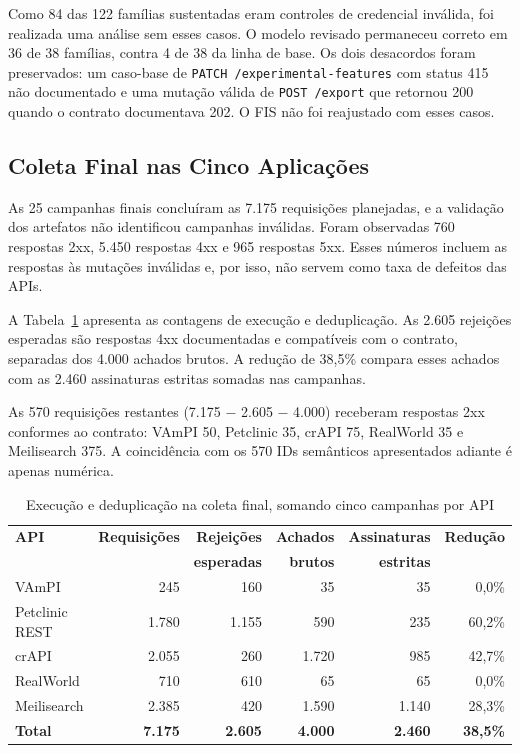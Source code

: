 Como 84 das 122 famílias sustentadas eram controles de credencial inválida, foi
realizada uma análise sem esses casos. O modelo revisado permaneceu correto em
36 de 38 famílias, contra 4 de 38 da linha de base. Os dois desacordos foram
preservados: um caso-base de \texttt{PATCH /experimental-features} com status
415 não documentado e uma mutação válida de \texttt{POST /export} que retornou
200 quando o contrato documentava 202. O FIS não foi reajustado com esses casos.

\subsection{Coleta Final nas Cinco Aplicações}\label{sec:coleta-final}

As 25 campanhas finais concluíram as 7.175 requisições planejadas, e a
validação dos artefatos não identificou campanhas inválidas. Foram observadas
760 respostas 2xx, 5.450 respostas 4xx e 965 respostas 5xx. Esses números incluem as respostas às
mutações inválidas e, por isso, não servem como taxa de defeitos das APIs.

A Tabela~\ref{tab:coleta-final} apresenta as contagens de execução e
deduplicação. As 2.605 rejeições esperadas são respostas 4xx documentadas e
compatíveis com o contrato, separadas dos 4.000 achados brutos. A redução de
38,5\% compara esses achados com as 2.460 assinaturas estritas somadas nas
campanhas.

As 570 requisições restantes (7.175 $-$ 2.605 $-$ 4.000) receberam respostas
2xx conformes ao contrato: VAmPI 50, Petclinic 35, crAPI 75, RealWorld 35 e
Meilisearch 375. A coincidência com os 570 IDs semânticos apresentados adiante
é apenas numérica.

\begin{table}[H]
\centering
\caption{Execução e deduplicação na coleta final, somando cinco campanhas por API}
\label{tab:coleta-final}
\small
\setlength{\tabcolsep}{5pt}
\begin{tabular}{|l|r|r|r|r|r|}
\hline
\textbf{API} & \textbf{Requisições} & \textbf{Rejeições} & \textbf{Achados} & \textbf{Assinaturas} & \textbf{Redução} \\
 & & \textbf{esperadas} & \textbf{brutos} & \textbf{estritas} & \\ \hline
VAmPI & 245 & 160 & 35 & 35 & 0,0\% \\ \hline
Petclinic REST & 1.780 & 1.155 & 590 & 235 & 60,2\% \\ \hline
crAPI & 2.055 & 260 & 1.720 & 985 & 42,7\% \\ \hline
RealWorld & 710 & 610 & 65 & 65 & 0,0\% \\ \hline
Meilisearch & 2.385 & 420 & 1.590 & 1.140 & 28,3\% \\ \hline
\textbf{Total} & \textbf{7.175} & \textbf{2.605} & \textbf{4.000} & \textbf{2.460} & \textbf{38,5\%} \\ \hline
\end{tabular}
\end{table}

